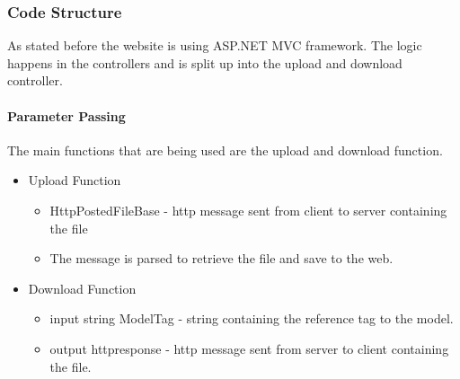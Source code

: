     \subsubsection{Code Structure}
    As stated before the website is using ASP.NET MVC framework. 
    The logic happens in the controllers and is split up into the upload and download controller.
    
    \paragraph{Parameter Passing}
    \hfill \break
    The main functions that are being used are the upload and download function.
    
    \begin{itemize}
        \item Upload Function
        \begin{itemize}
           \item HttpPostedFileBase - http message sent from client to server containing the file
           \item The message is parsed to retrieve the file and save to the web.
        \end{itemize}

        \item Download Function
        \begin{itemize}
            \item input string ModelTag - string containing the reference tag to the model.
            \item output httpresponse - http message sent from server to client containing the file. 
        \end{itemize}
    \end{itemize}